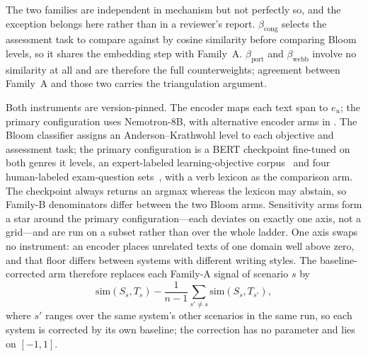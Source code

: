 The two families are independent in mechanism but not perfectly so, and the
exception belongs here rather than in a reviewer's report.
$\beta_{\mathrm{cong}}$ selects the assessment task to compare against by cosine
similarity before comparing Bloom levels, so it shares the embedding step with
Family~A. $\beta_{\mathrm{port}}$ and $\beta_{\mathrm{webb}}$ involve no similarity
at all and are therefore the full counterweights; agreement between Family~A and
those two carries the triangulation argument.

Both instruments are version-pinned. The encoder maps each text span to $e_u$; the
primary configuration uses Nemotron-8B, with alternative encoder arms in
. The Bloom classifier assigns an Anderson--Krathwohl level to
each objective and assessment task; the primary configuration is a BERT checkpoint
fine-tuned on both genres it levels, an expert-labeled learning-objective
corpus~\cite{li2022bloomclassification} and four human-labeled exam-question
sets~\cite{faraji2026crossdataset}, with a verb lexicon as the comparison arm.
The checkpoint always returns an argmax whereas the lexicon may abstain, so Family-B
denominators differ between the two Bloom arms. Sensitivity arms form a star around
the primary configuration---each deviates on exactly one axis, not a grid---and are
run on a subset rather than over the whole ladder. One axis swaps no instrument: an
encoder places unrelated texts of one domain well above zero, and that floor differs
between systems with different writing styles. The baseline-corrected arm therefore
replaces each Family-A signal of scenario $s$ by
\[
  \mathrm{sim}(S_s,T_s) - \frac{1}{n-1}\sum_{s'\neq s}\mathrm{sim}(S_s,T_{s'}),
\]
where $s'$ ranges over the same system's other scenarios in the same run, so each
system is corrected by its own baseline; the correction has no parameter and lies on
$[-1,1]$.

